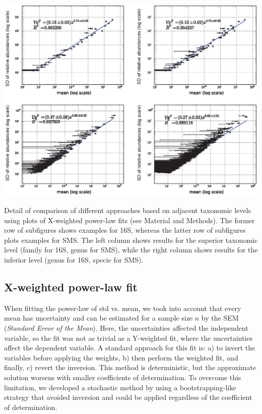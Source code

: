 \begin{supfig} 
  \includegraphics[width=1.0\textwidth]{figs/supfig_taxlev2.eps}
\caption{Detail of comparison of different approaches based on adjacent taxonomic levels using plots of X-weighted power-law fits (see Material and Methods). The former row of subfigures shows examples for 16S, whereas the latter row of subfigures plots examples for SMS. The left column shows results for the superior taxonomic level (family for 16S, genus for SMS), while the right column shows results for the inferior level (genus for 16S, specie for SMS).}
\label{supfig:taxlev2}
\end{supfig}

\subsection*{X-weighted power-law fit}\label{sec:X-w}

When fitting the power-law of std vs. mean, we took into account that every mean has uncertainty and can be estimated for a sample size $n$ by the SEM (\emph{Standard Error of the Mean}). Here, the uncertainties affected the independent variable, so the fit was not as trivial as a Y-weighted fit, where the uncertainties affect the dependent variable. A standard approach for this fit is: a) to invert the variables before applying the weights, b) then perform the weighted fit, and finally, c) revert the inversion. This method is deterministic, but the approximate solution worsens with smaller coefficients of determination. To overcome this limitation, we developed a stochastic method by using a bootstrapping-like strategy that avoided inversion and could be applied regardless of the coefficient of determination.

